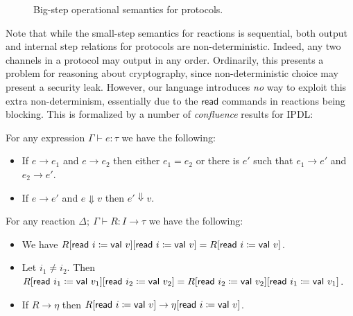 \begin{figure}
\caption{Big-step operational semantics for \ipdl protocols.}
\label{fig:protocols_big_step}
\end{figure}

Note that while the small-step semantics for reactions is sequential, both output and internal step relations for protocols are non-deterministic. Indeed, any two channels in a protocol may output in any order. Ordinarily, this presents a problem for reasoning about cryptography, since non-deterministic choice may present a security leak. However, our language introduces \emph{no} way to exploit this extra non-determinism, essentially due to the $\mathsf{read}$ commands in reactions being blocking. This is formalized by a number of \emph{confluence} results for \textsf{IPDL}:

\begin{lemma}
For any expression $\Gamma \vdash e : \tau$ we have the following:
\begin{itemize}
\item If $e \to e_1$ and $e \to e_2$ then either $e_1 = e_2$ or there is $e'$ such that $e_1 \to e'$ and $e_2 \to e'$.
\item If $e \to e'$ and $e \Downarrow v$ then $e' \Downarrow v$.
\end{itemize}
\end{lemma}

\begin{lemma}
For any reaction $\Delta; \ \Gamma \vdash R : I \to \tau$ we have the following:
\begin{itemize}
\item We have $R[\mathsf{read} \ i \coloneqq \mathsf{val} \ v][\mathsf{read} \ i \coloneqq \mathsf{val} \ v] = R[\mathsf{read} \ i \coloneqq \mathsf{val} \ v]$.
\item Let $i_1 \neq i_2$. Then $R[\mathsf{read} \ i_1 \coloneqq \mathsf{val} \ v_1][\mathsf{read} \ i_2 \coloneqq \mathsf{val} \ v_2] = R[\mathsf{read} \ i_2 \coloneqq \mathsf{val} \ v_2][\mathsf{read} \ i_1 \coloneqq \mathsf{val} \ v_1]$.
\item If $R \to \eta$ then $R[\mathsf{read} \ i \coloneqq \mathsf{val} \ v] \to \eta[\mathsf{read} \ i \coloneqq \mathsf{val} \ v]$.
\end{itemize}
\end{lemma}

